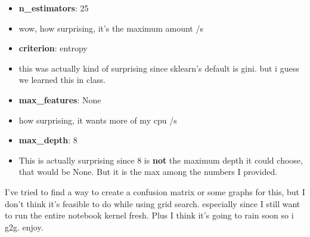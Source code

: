 \documentclass[11pt]{article}
\providecommand{\tightlist}{%
      \setlength{\itemsep}{0pt}\setlength{\parskip}{0pt}}
\begin{document}
\begin{itemize}
\tightlist
\item
  \textbf{n\_estimators}: 25
\item
  wow, how surprising, it's the maximum amount /s
\item
  \textbf{criterion}: entropy
\item
  this was actually kind of surprising since sklearn's default is gini.
  but i guess we learned this in class.
\item
  \textbf{max\_features}: None
\item
  how surprising, it wants more of my cpu /s
\item
  \textbf{max\_depth}: 8
\item
  This is actually surprising since 8 is \textbf{not} the maximum depth
  it could choose, that would be None. But it is the max among the
  numbers I provided.
\end{itemize}

I've tried to find a way to create a confusion matrix or some graphs for
this, but I don't think it's feasible to do while using grid search.
especially since I still want to run the entire notebook kernel fresh.
Plus I think it's going to rain soon so i g2g. enjoy.


    
    
    
    
\end{document}
